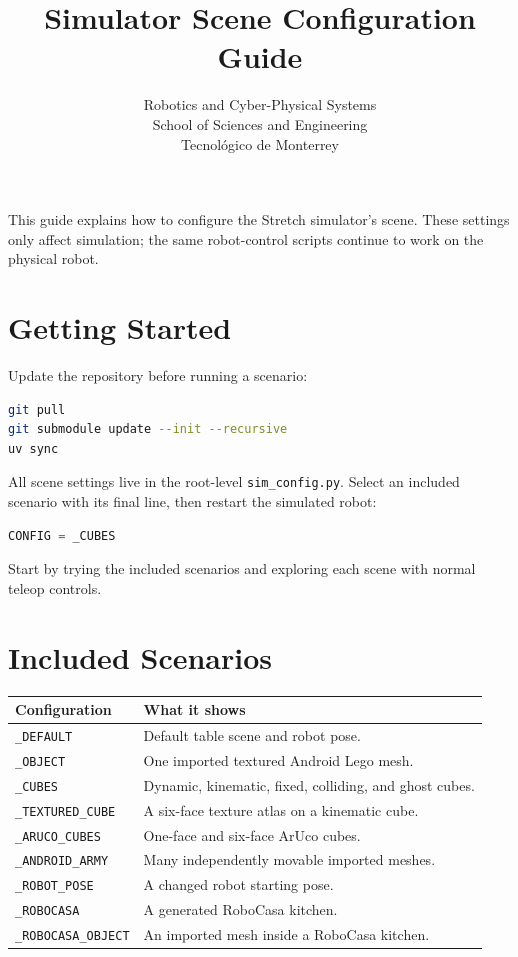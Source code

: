\documentclass[11pt,a4paper]{article}
\title{\textbf{Simulator Scene Configuration Guide}}
\author{Robotics and Cyber-Physical Systems \\
School of Sciences and Engineering \\
Tecnol\'ogico de Monterrey}
\date{}
\begin{document}
\maketitle

This guide explains how to configure the Stretch simulator's scene. These
settings only affect simulation; the same robot-control scripts continue to
work on the physical robot.

\section{Getting Started}

Update the repository before running a scenario:

\begin{lstlisting}[language=bash]
git pull
git submodule update --init --recursive
uv sync
\end{lstlisting}

All scene settings live in the root-level \texttt{sim\_config.py}. Select an
included scenario with its final line, then restart the simulated robot:

\begin{lstlisting}[language=Python]
CONFIG = _CUBES
\end{lstlisting}

Start by trying the included scenarios and exploring each scene with normal
teleop controls.

\section{Included Scenarios}

\begin{center}
\begin{tabular}{ll}
\toprule
\textbf{Configuration} & \textbf{What it shows} \\
\midrule
\texttt{\_DEFAULT} & Default table scene and robot pose. \\
\texttt{\_OBJECT} & One imported textured Android Lego mesh. \\
\texttt{\_CUBES} & Dynamic, kinematic, fixed, colliding, and ghost cubes. \\
\texttt{\_TEXTURED\_CUBE} & A six-face texture atlas on a kinematic cube. \\
\texttt{\_ARUCO\_CUBES} & One-face and six-face ArUco cubes. \\
\texttt{\_ANDROID\_ARMY} & Many independently movable imported meshes. \\
\texttt{\_ROBOT\_POSE} & A changed robot starting pose. \\
\texttt{\_ROBOCASA} & A generated RoboCasa kitchen. \\
\texttt{\_ROBOCASA\_OBJECT} & An imported mesh inside a RoboCasa kitchen. \\
\bottomrule
\end{tabular}
\end{center}
\end{document}
